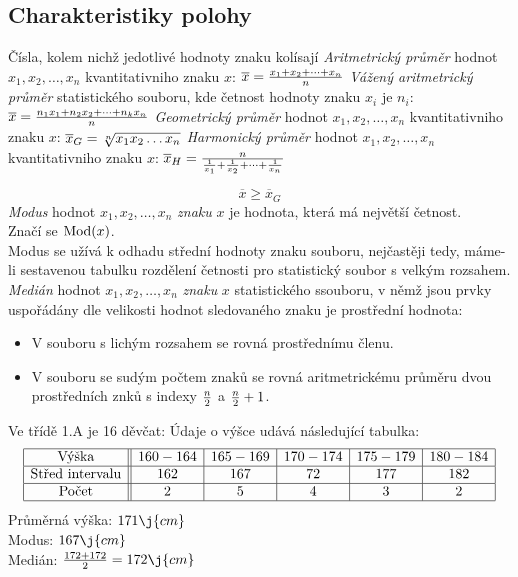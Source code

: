 \subsection{Charakteristiky polohy}
\Poz Čísla, kolem nichž jedotlivé hodnoty znaku kolísají 
\Def \emph{Aritmetrický průměr} hodnot $x_1,x_2,\dots,x_n$ kvantitativniho znaku $x$: $\overline{x}=\frac{x_1+x_2+\dots+x_n}n$
\Def \emph{Vážený aritmetrický průměr} statistického souboru, kde četnost hodnoty znaku $x_i$ je $n_i$: $\overline{x}=\frac{n_1x_1+n_2x_2+\dots+n_kx_n}n$
\Def \emph{Geometrický průměr} hodnot $x_1,x_2,\dots,x_n$ kvantitativniho znaku $x$: $\overline{x}_G=\sqrt[n]{x_1\*x_2\*\dots\*x_n}$
\Def \emph{Harmonický průměr} hodnot $x_1,x_2,\dots,x_n$ kvantitativniho znaku $x$: $\overline{x}_H=\frac{n}{\frac{1}{x_1}+\frac{1}{x_2}+\dots+\frac{1}{x_n}}$

\V[AG-nerovnost] $$\overline x \ge \overline x_G$$
\Def \emph{Modus} hodnot $x_1,x_2,\dots,x_n$ \emph{znaku} $x$ je hodnota, která má největší četnost.\\
Značí se ${\rm Mod}(x)$.\\
Modus se užívá k odhadu střední hodnoty znaku souboru, nejčastěji tedy, máme-li sestavenou tabulku rozdělení četnosti pro statistický soubor s velkým rozsahem.
\Def \emph{Medián} hodnot $x_1,x_2,\dots,x_n$ \emph{znaku} $x$ statistického ssouboru, v němž jsou prvky uspořádány dle velikosti hodnot sledovaného znaku je prostřední hodnota:\\
\begin{itemize}
	\item V souboru s lichým rozsahem se rovná prostřednímu členu.
	\item V souboru se sudým počtem znaků se rovná aritmetrickému průměru dvou prostředních znků s indexy $\frac n 2 $ a $\frac n 2 + 1$.
\end{itemize}

\Pr Ve třídě 1.A je 16 děvčat: Údaje o výšce udává následující tabulka:
$$ \begin{array}{|c||c|c|c|c|c|}\hline
	\text{Výška} & 160-164 & 165-169 & 170-174 & 175-179 & 180-184 \\\hline
	\text{Střed intervalu} & 162 & 167 & 72 & 177 & 182 \\\hline
	\text{Počet} & 2 & 5 & 4 & 3 & 2\\\hline
\end{array} $$
Průměrná výška: $171\j{cm}$\\
Modus: $167\j{cm}$\\
Medián: $\f{172+172}2=172\j{cm}$


